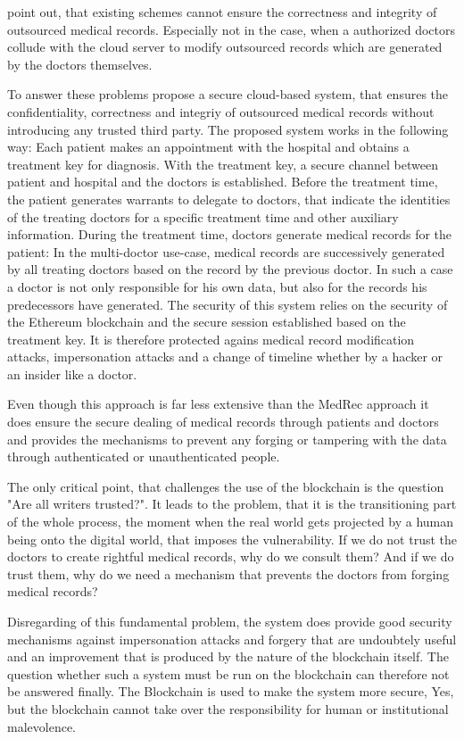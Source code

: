 \citeauthor{Cao2019} point out, that existing schemes cannot ensure the correctness and integrity of outsourced medical records. Especially not in the case, when a authorized doctors collude with the cloud server to modify outsourced records which are generated by the doctors themselves.

To answer these problems \citeauthor{Cao2019} propose a secure cloud-based system, that ensures the confidentiality, correctness and integriy of outsourced medical records without introducing any trusted third party. 
The proposed system works in the following way: Each patient makes an appointment with the hospital and obtains a treatment key for diagnosis. With the treatment key, a secure channel between patient and hospital and the doctors is established. 
Before the treatment time, the patient generates warrants to delegate to doctors, that indicate the identities of the treating doctors for a specific treatment time and other auxiliary information.
During the treatment time, doctors generate medical records for the patient: In the multi-doctor use-case, medical records are successively generated by all treating doctors based on the record by the previous doctor. In such a case a doctor is not only responsible for his own data, but also for the records his predecessors have generated.
The security of this system relies on the security of the Ethereum blockchain and the secure session established based on the treatment key. It is therefore protected agains medical record modification attacks, impersonation attacks and a change of timeline whether by a hacker or an insider like a doctor.

Even though this approach is far less extensive than the MedRec approach it does ensure the secure dealing of medical records through patients and doctors and provides the mechanisms to prevent any forging or tampering with the data through authenticated or unauthenticated people.

The only critical point, that challenges the use of the blockchain is the question "Are all writers trusted?"\cite{Wust2017}. It leads to the  problem, that it is the transitioning part of the whole process, the moment when the real world gets projected by a human being onto the digital world, that imposes the vulnerability.
If we do not trust the doctors to create rightful medical records, why do we consult them? And if we do trust them, why do we need a mechanism that prevents the doctors from forging medical records?

Disregarding of this fundamental problem, the system does provide good security mechanisms against impersonation attacks and forgery that are undoubtely useful and an improvement that is produced by the nature of the blockchain itself.
The question whether such a system must be run on the blockchain can therefore not be answered finally. The Blockchain is used to make the system more secure, Yes, but the blockchain cannot take over the responsibility for human or institutional malevolence.


